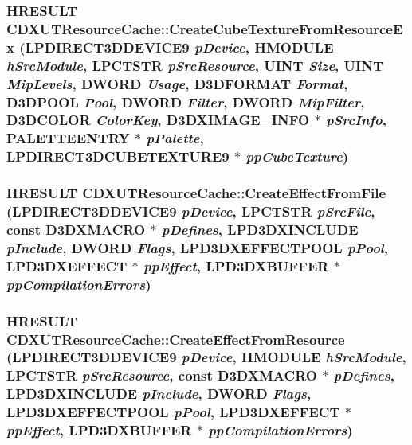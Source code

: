 \label{class_c_d_x_u_t_resource_cache_a778a88f6051a949abb95dc1923c13b83}
\hypertarget{class_c_d_x_u_t_resource_cache_afdf53d69820d5c0f5f9af4d7b51bd81a}{
\subsubsection[{CreateCubeTextureFromResourceEx}]{\setlength{\rightskip}{0pt plus 5cm}HRESULT CDXUTResourceCache::CreateCubeTextureFromResourceEx (LPDIRECT3DDEVICE9 {\em pDevice}, \/  HMODULE {\em hSrcModule}, \/  LPCTSTR {\em pSrcResource}, \/  UINT {\em Size}, \/  UINT {\em MipLevels}, \/  DWORD {\em Usage}, \/  D3DFORMAT {\em Format}, \/  D3DPOOL {\em Pool}, \/  DWORD {\em Filter}, \/  DWORD {\em MipFilter}, \/  D3DCOLOR {\em ColorKey}, \/  D3DXIMAGE\_\-INFO $\ast$ {\em pSrcInfo}, \/  PALETTEENTRY $\ast$ {\em pPalette}, \/  LPDIRECT3DCUBETEXTURE9 $\ast$ {\em ppCubeTexture})}}
\label{class_c_d_x_u_t_resource_cache_afdf53d69820d5c0f5f9af4d7b51bd81a}
\hypertarget{class_c_d_x_u_t_resource_cache_a7752a899e2deab9c7b691adc72c45792}{
\subsubsection[{CreateEffectFromFile}]{\setlength{\rightskip}{0pt plus 5cm}HRESULT CDXUTResourceCache::CreateEffectFromFile (LPDIRECT3DDEVICE9 {\em pDevice}, \/  LPCTSTR {\em pSrcFile}, \/  const D3DXMACRO $\ast$ {\em pDefines}, \/  LPD3DXINCLUDE {\em pInclude}, \/  DWORD {\em Flags}, \/  LPD3DXEFFECTPOOL {\em pPool}, \/  LPD3DXEFFECT $\ast$ {\em ppEffect}, \/  LPD3DXBUFFER $\ast$ {\em ppCompilationErrors})}}
\label{class_c_d_x_u_t_resource_cache_a7752a899e2deab9c7b691adc72c45792}
\hypertarget{class_c_d_x_u_t_resource_cache_a6bc96eb215a1888bdcbffcbb63e45f6d}{
\subsubsection[{CreateEffectFromResource}]{\setlength{\rightskip}{0pt plus 5cm}HRESULT CDXUTResourceCache::CreateEffectFromResource (LPDIRECT3DDEVICE9 {\em pDevice}, \/  HMODULE {\em hSrcModule}, \/  LPCTSTR {\em pSrcResource}, \/  const D3DXMACRO $\ast$ {\em pDefines}, \/  LPD3DXINCLUDE {\em pInclude}, \/  DWORD {\em Flags}, \/  LPD3DXEFFECTPOOL {\em pPool}, \/  LPD3DXEFFECT $\ast$ {\em ppEffect}, \/  LPD3DXBUFFER $\ast$ {\em ppCompilationErrors})}}
